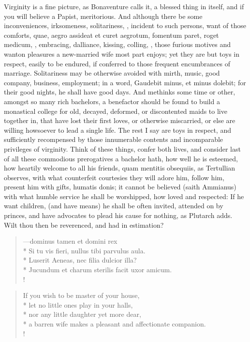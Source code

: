 Virginity is a fine picture, as Bonaventure calls it, a blessed
thing in itself, and if you will believe a Papist, meritorious. And
although there be some inconveniences, irksomeness, solitariness, \etc{},
incident to such persons, want of those comforts, quae, aegro assideat
et curet aegrotum, fomentum paret, roget medicum, \etc{}, embracing,
dalliance, kissing, colling, \etc{}, those furious motives and wanton
pleasures a new-married wife most part enjoys; yet they are but toys in
respect, easily to be endured, if conferred to those frequent
encumbrances of marriage. Solitariness may be otherwise avoided with
mirth, music, good company, business, employment; in a word,
Gaudebit minus, et minus dolebit; for their good nights, he shall
have good days. And methinks some time or other, amongst so many rich
bachelors, a benefactor should be found to build a monastical college
for old, decayed, deformed, or discontented maids to live together in,
that have lost their first loves, or otherwise miscarried, or else are
willing howsoever to lead a single life. The rest I say are toys in
respect, and sufficiently recompensed by those innumerable contents and
incomparable privileges of virginity. Think of these things, confer
both lives, and consider last of all these commodious prerogatives a
bachelor hath, how well he is esteemed, how heartily welcome to all his
friends, quam mentitis obsequiis, as Tertullian observes, with what
counterfeit courtesies they will adore him, follow him, present him
with gifts, humatis donis; it cannot be believed (saith Ammianus)
with what humble service he shall be worshipped, how loved and
respected: If he want children, (and have means) he shall be often
invited, attended on by princes, and have advocates to plead his cause
for nothing, as Plutarch adds. Wilt thou then be reverenced, and
had in estimation?
%
\begin{latin}
\begin{verse}%
---dominus tamen et domini rex\\*
Si tu vis fieri, nullus tibi parvulus aula.\\*
Luserit Aeneas, nec filia dulcior illa?\\*
Jucundum et charum sterilis facit uxor amicum.\\!
\end{verse}%
\end{latin}
\translationrule%
\begin{verse}%
If you wish to be master of your house,\\*
let no little ones play in your halls,\\*
nor any little daughter yet more dear,\\*
a barren wife makes a pleasant and affectionate companion.\\!
\end{verse}%
%

